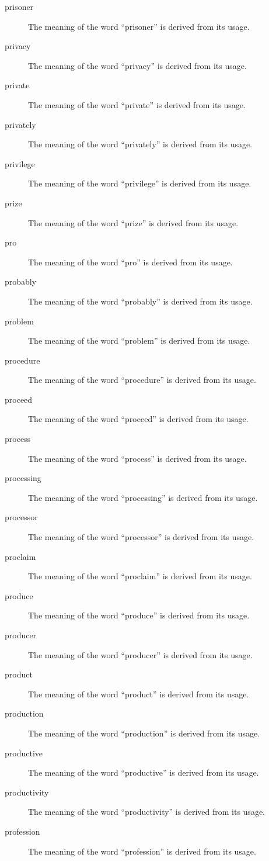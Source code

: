 \documentclass[12pt, letterpaper]{memoir}
\begin{document}
\begin{description}
\item[prisoner] The meaning of the word ``prisoner'' is derived from its usage.
\item[privacy] The meaning of the word ``privacy'' is derived from its usage.
\item[private] The meaning of the word ``private'' is derived from its usage.
\item[privately] The meaning of the word ``privately'' is derived from its usage.
\item[privilege] The meaning of the word ``privilege'' is derived from its usage.
\item[prize] The meaning of the word ``prize'' is derived from its usage.
\item[pro] The meaning of the word ``pro'' is derived from its usage.
\item[probably] The meaning of the word ``probably'' is derived from its usage.
\item[problem] The meaning of the word ``problem'' is derived from its usage.
\item[procedure] The meaning of the word ``procedure'' is derived from its usage.
\item[proceed] The meaning of the word ``proceed'' is derived from its usage.
\item[process] The meaning of the word ``process'' is derived from its usage.
\item[processing] The meaning of the word ``processing'' is derived from its usage.
\item[processor] The meaning of the word ``processor'' is derived from its usage.
\item[proclaim] The meaning of the word ``proclaim'' is derived from its usage.
\item[produce] The meaning of the word ``produce'' is derived from its usage.
\item[producer] The meaning of the word ``producer'' is derived from its usage.
\item[product] The meaning of the word ``product'' is derived from its usage.
\item[production] The meaning of the word ``production'' is derived from its usage.
\item[productive] The meaning of the word ``productive'' is derived from its usage.
\item[productivity] The meaning of the word ``productivity'' is derived from its usage.
\item[profession] The meaning of the word ``profession'' is derived from its usage.

\end{description}
\end{document}
